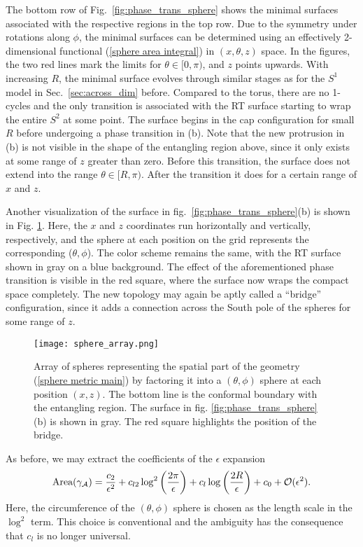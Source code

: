 \documentclass[11 pt]{article}
\begin{document}
The bottom row of Fig.~\ref{fig:phase_trans_sphere} shows the minimal surfaces associated with the respective regions in the top row. 
%
Due to the symmetry under rotations along $\phi$, the minimal surfaces can be determined using an effectively 2-dimensional functional (\ref{sphere area integral}) in $(x,\theta,z)$ space. In the figures, the two red lines mark the limits for $\theta\in[0,\pi)$, and $z$ points upwards. With increasing $R$, the minimal surface evolves through similar stages as for the $S^1$ model in Sec.~\ref{sec:across_dim} before. Compared to the torus, there are no 1-cycles and the only transition is associated with the RT surface starting to wrap the entire $S^2$ at some point. The surface begins in the cap configuration for small $R$ before undergoing a phase transition in (b). Note that the new protrusion in (b) is not visible in the shape of the entangling region above, since it only exists at some range of $z$ greater than zero. Before this transition, the surface does not extend into the range $\theta \in [R,\pi)$. After the transition it does for a certain range of $x$ and $z$. 

Another visualization of the surface in fig.~\ref{fig:phase_trans_sphere}(b) is shown in Fig. \ref{fig:sphere_array}. Here, the $x$ and $z$ coordinates run horizontally and vertically, respectively, and the sphere at each position on the grid represents the corresponding ($\theta,\phi$). The color scheme remains the same, with the RT surface shown in gray on a blue background. The effect of the aforementioned phase transition is visible in the red square, where the surface now wraps the compact space completely. The new topology may again be aptly called a ``bridge'' configuration, since it adds a connection across the South pole of the spheres for some range of $z$.

\begin{figure}
    \centering
    \texttt{[image: sphere\_array.png]}
    \caption{Array of spheres representing the spatial part of the geometry (\ref{sphere metric main}) by factoring it into a $(\theta,\phi)$ sphere at each position $(x,z)$. The bottom line is the conformal boundary with the entangling region. The surface in fig. \ref{fig:phase_trans_sphere}(b) is shown in gray. The red square highlights the position of the bridge.}
    \label{fig:sphere_array}
\end{figure}

As before, we may extract the coefficients of the $\epsilon$ expansion
\begin{equation}
    \text{Area}(\gamma_{\cal A}) =\frac{c_2}{\epsilon^2} + c_{l2}\log^2\left(\frac{2\pi}{\epsilon}\right) + c_l\log\left(\frac{2R}{\epsilon}\right) + c_0 + \mathcal{O}(\epsilon^2).
    \label{S2_EE_expansion}
\end{equation}
Here, the circumference of the $(\theta,\phi)$ sphere is chosen as the length scale in the $\log^2$ term. This choice is conventional and the ambiguity has the consequence that $c_l$ is no longer universal.
\end{document}
